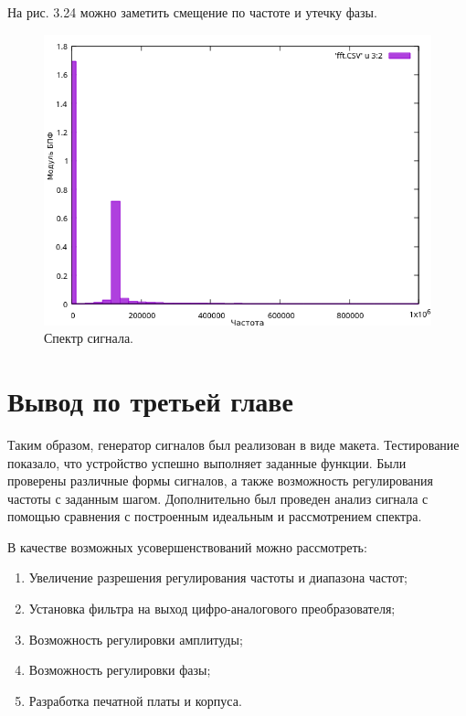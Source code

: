 	На рис. 3.24 можно заметить смещение по частоте и утечку фазы.

	\begin{figure}[H]
    \centering
    \includegraphics[width=1\textwidth]{../image/fft.png}
    \caption{Спектр сигнала.}
	\end{figure}	
	
		
	
\section{Вывод по третьей главе}
	Таким образом, генератор сигналов был реализован в виде макета. Тестирование показало, что устройство успешно выполняет заданные функции. Были проверены различные формы сигналов, а также возможность регулирования частоты с заданным шагом. Дополнительно был проведен анализ сигнала с помощью сравнения с построенным идеальным и рассмотрением спектра. 
	
	В качестве возможных усовершенствований можно рассмотреть:
	\begin{enumerate}
	\item Увеличение разрешения регулирования частоты и диапазона частот;
	\item Установка фильтра на выход цифро-аналогового преобразователя;
	\item Возможность регулировки амплитуды;
	\item Возможность регулировки фазы;
	\item Разработка печатной платы и корпуса.
	\end{enumerate}